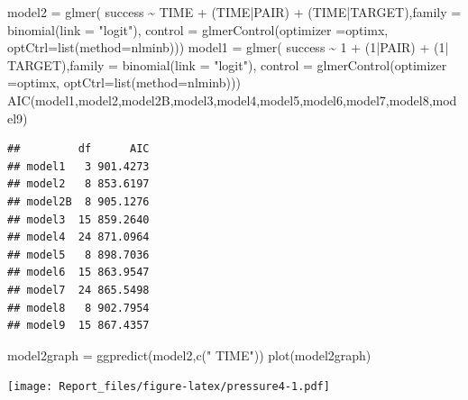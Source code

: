 \documentclass[
]{article}
\newenvironment{Shaded}{\begin{snugshade}}{\end{snugshade}}
\newcommand{\AttributeTok}[1]{\textcolor[rgb]{0.77,0.63,0.00}{#1}}
\newcommand{\DecValTok}[1]{\textcolor[rgb]{0.00,0.00,0.81}{#1}}
\newcommand{\FunctionTok}[1]{\textcolor[rgb]{0.00,0.00,0.00}{#1}}
\newcommand{\NormalTok}[1]{#1}
\newcommand{\OtherTok}[1]{\textcolor[rgb]{0.56,0.35,0.01}{#1}}
\newcommand{\SpecialCharTok}[1]{\textcolor[rgb]{0.00,0.00,0.00}{#1}}
\newcommand{\StringTok}[1]{\textcolor[rgb]{0.31,0.60,0.02}{#1}}
\begin{document}
\begin{Shaded}
\begin{Highlighting}[]
\NormalTok{model2 }\OtherTok{=} \FunctionTok{glmer}\NormalTok{( success }\SpecialCharTok{\textasciitilde{}}\NormalTok{ TIME }\SpecialCharTok{+}\NormalTok{ (TIME}\SpecialCharTok{|}\NormalTok{PAIR) }\SpecialCharTok{+}\NormalTok{ (TIME}\SpecialCharTok{|}\NormalTok{TARGET),}\AttributeTok{family =} \FunctionTok{binomial}\NormalTok{(}\AttributeTok{link =} \StringTok{"logit"}\NormalTok{), }\AttributeTok{control =} \FunctionTok{glmerControl}\NormalTok{(}\AttributeTok{optimizer =}\StringTok{\textquotesingle{}optimx\textquotesingle{}}\NormalTok{, }\AttributeTok{optCtrl=}\FunctionTok{list}\NormalTok{(}\AttributeTok{method=}\StringTok{\textquotesingle{}nlminb\textquotesingle{}}\NormalTok{)))}
\NormalTok{model1 }\OtherTok{=} \FunctionTok{glmer}\NormalTok{( success }\SpecialCharTok{\textasciitilde{}} \DecValTok{1}  \SpecialCharTok{+}\NormalTok{ (}\DecValTok{1}\SpecialCharTok{|}\NormalTok{PAIR) }\SpecialCharTok{+}\NormalTok{ (}\DecValTok{1}\SpecialCharTok{|}\NormalTok{ TARGET),}\AttributeTok{family =} \FunctionTok{binomial}\NormalTok{(}\AttributeTok{link =} \StringTok{"logit"}\NormalTok{), }\AttributeTok{control =} \FunctionTok{glmerControl}\NormalTok{(}\AttributeTok{optimizer =}\StringTok{\textquotesingle{}optimx\textquotesingle{}}\NormalTok{, }\AttributeTok{optCtrl=}\FunctionTok{list}\NormalTok{(}\AttributeTok{method=}\StringTok{\textquotesingle{}nlminb\textquotesingle{}}\NormalTok{)))}
\FunctionTok{AIC}\NormalTok{(model1,model2,model2B,model3,model4,model5,model6,model7,model8,model9)}
\end{Highlighting}
\end{Shaded}

\begin{verbatim}
##         df      AIC
## model1   3 901.4273
## model2   8 853.6197
## model2B  8 905.1276
## model3  15 859.2640
## model4  24 871.0964
## model5   8 898.7036
## model6  15 863.9547
## model7  24 865.5498
## model8   8 902.7954
## model9  15 867.4357
\end{verbatim}

\begin{Shaded}
\begin{Highlighting}[]
\NormalTok{model2graph }\OtherTok{=} \FunctionTok{ggpredict}\NormalTok{(model2,}\FunctionTok{c}\NormalTok{(}\StringTok{" TIME"}\NormalTok{))}
\FunctionTok{plot}\NormalTok{(model2graph)}
\end{Highlighting}
\end{Shaded}

\texttt{[image: Report\_files/figure-latex/pressure4-1.pdf]}
\end{document}
